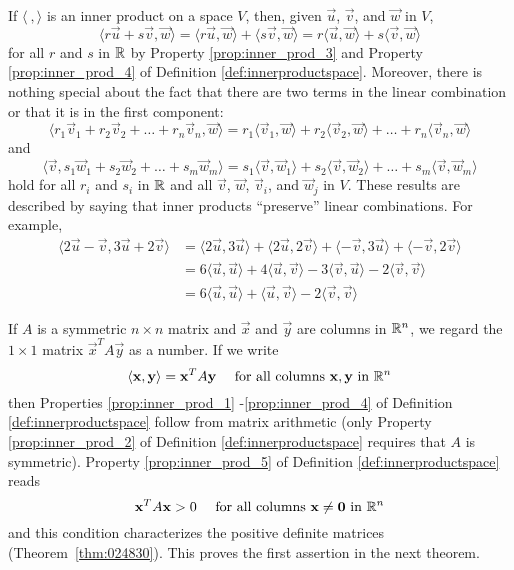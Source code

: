 \documentclass{ximera}
\begin{document}
If $\langle\ , \rangle$ is an inner product on a space $V$, then, given $\vec{u}$, $\vec{v}$, and $\vec{w}$ in $V$,
\begin{equation*}
\langle r\vec{u} + s\vec{v}, \vec{w} \rangle = \langle r\vec{u}, \vec{w} \rangle + \langle s\vec{v}, \vec{w} \rangle = r\langle \vec{u}, \vec{w} \rangle + s\langle \vec{v}, \vec{w} \rangle
\end{equation*}
for all $r$ and $s$ in $\mathbb{R}$ by  Property \ref{prop:inner_prod_3} and Property \ref{prop:inner_prod_4} of Definition \ref{def:innerproductspace}. Moreover, there is nothing special about the fact that there are two terms in the linear combination or that it is in the first component:
\begin{equation*}
\langle r_1\vec{v}_1 + r_2\vec{v}_2 + \dots + r_n\vec{v}_n, \vec{w} \rangle =
r_1\langle \vec{v}_1, \vec{w} \rangle +
r_2\langle \vec{v}_2, \vec{w} \rangle + \dots +
r_n\langle \vec{v}_n, \vec{w} \rangle
\end{equation*}
and
\begin{equation*}
\langle \vec{v}, s_1\vec{w}_1 + s_2\vec{w}_2 + \dots + s_m\vec{w}_m \rangle =
s_1\langle \vec{v}, \vec{w}_1 \rangle +
s_2\langle \vec{v}, \vec{w}_2 \rangle + \dots +
s_m\langle \vec{v}, \vec{w}_m \rangle
\end{equation*}
hold for all $r_{i}$ and $s_{i}$ in $\mathbb{R}$ and all $\vec{v}$, $\vec{w}$, $\vec{v}_{i}$, and $\vec{w}_{j}$ in $V$. These results are described by saying that inner products ``preserve'' linear combinations. For example,
\begin{align*}
\langle 2\vec{u} - \vec{v}, 3\vec{u} + 2\vec{v} \rangle &=
\langle 2\vec{u}, 3\vec{u} \rangle + \langle 2\vec{u}, 2\vec{v} \rangle + \langle -\vec{v}, 3\vec{u} \rangle + \langle -\vec{v}, 2\vec{v} \rangle \\
&= 6 \langle \vec{u}, \vec{u} \rangle + 4 \langle \vec{u}, \vec{v} \rangle -3 \langle \vec{v}, \vec{u} \rangle - 2 \langle \vec{v}, \vec{v} \rangle \\
&= 6 \langle \vec{u}, \vec{u} \rangle + \langle \vec{u}, \vec{v} \rangle - 2 \langle \vec{v}, \vec{v} \rangle
\end{align*}

If $A$ is a symmetric $n \times n$ matrix and $\vec{x}$ and $\vec{y}$ are columns in $\mathbb{R}^n$, we regard the $1 \times 1$ matrix $\vec{x}^{T}A\vec{y}$ as a number. If we write
\begin{equation*}
\langle \mathbf{x}, \mathbf{y} \rangle = \mathbf{x}^TA\mathbf{y} \quad \mbox{ for all columns } \mathbf{x}, \mathbf{y} \mbox{ in } \mathbb{R}^n
\end{equation*}
then  Properties \ref{prop:inner_prod_1} -\ref{prop:inner_prod_4} of Definition \ref{def:innerproductspace} follow from matrix arithmetic (only Property \ref{prop:inner_prod_2} of Definition \ref{def:innerproductspace} requires that $A$ is symmetric).  Property \ref{prop:inner_prod_5} of Definition \ref{def:innerproductspace} reads
\begin{equation*}
\mathbf{x}^TA \mathbf{x} > 0 \quad \mbox{ for all columns } \mathbf{x} \neq \mathbf{0} \mbox{ in } \mathbb{R}^n
\end{equation*}
and this condition characterizes the positive definite matrices  (Theorem~\ref{thm:024830}). This proves the first assertion in the next theorem.
\end{document}
